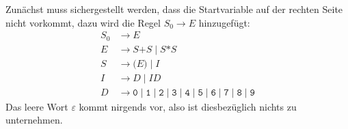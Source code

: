 \begin{loesung}
\begin{teilaufgaben}
\item 
Zunächst muss sichergestellt werden, dass die Startvariable auf der rechten
Seite nicht vorkommt, dazu wird die Regel $S_0\to E$ hinzugefügt:
\begin{align*}
S_0&\to E \\
E&\to S\texttt{+}S \;|\; S\texttt{*}S \\
S&\to \texttt{(}E\texttt{)} \;|\; I \\
I&\to D \;|\; I D \\
D&\to
\texttt{0}
\;|\;
\texttt{1}
\;|\;
\texttt{2}
\;|\;
\texttt{3}
\;|\;
\texttt{4}
\;|\;
\texttt{5}
\;|\;
\texttt{6}
\;|\;
\texttt{7}
\;|\;
\texttt{8}
\;|\;
\texttt{9}
\end{align*}
Das leere Wort $\varepsilon$ kommt nirgends vor, also ist diesbezüglich
nichts zu unternehmen.


\end{teilaufgaben}
\end{loesung}
